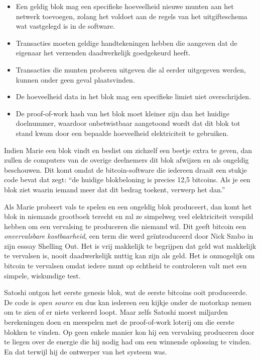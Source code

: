 \begin{itemize}
    \item Een geldig blok mag een specifieke hoeveelheid nieuwe munten aan het netwerk toevoegen, zolang het voldoet aan de regels van het uitgifteschema wat vastgelegd is in de software.
    \item Transacties moeten geldige handtekeningen hebben die aangeven dat de eigenaar het verzenden daadwerkelijk goedgekeurd heeft.
    \item Transacties die munten proberen uitgeven die al eerder uitgegeven werden, kunnen onder geen geval plaatsvinden.
    \item De hoeveelheid data in het blok mag een specifieke limiet niet overschrijden.
    \item De proof-of-work hash van het blok moet kleiner zijn dan het huidige doelnummer, waardoor onbetwistbaar aangetoond wordt dat dit blok tot stand kwam door een bepaalde hoeveelheid elektriciteit te gebruiken.
\end{itemize}

Indien Marie een blok vindt en beslist om zichzelf een beetje extra te geven, dan zullen de computers van de overige deelnemers dit blok afwijzen en als ongeldig beschouwen. Dit komt omdat de bitcoin-software die iedereen draait een stukje code bevat dat zegt: “de huidige blokbeloning is precies 12,5 bitcoins. Als je een blok ziet waarin iemand meer dat dit bedrag toekent, verwerp het dan.”

Als Marie probeert vals te spelen en een ongeldig blok produceert, dan komt het blok in niemands grootboek terecht en zal ze simpelweg veel elektriciteit verspild hebben om een vervalsing te produceren die niemand wil. Dit geeft bitcoin een \textit{onvervalsbare kostbaarheid}, een term die werd geïntroduceerd door Nick Szabo in zijn esssay \textquotedbl{}Shelling Out\textquotedbl{}. Het is vrij makkelijk te begrijpen dat geld wat makkelijk te vervalsen is, nooit daadwerkelijk nuttig kan zijn als geld. Het is onmogelijk om bitcoin te vervalsen omdat iedere munt op echtheid te controleren valt met een simpele, wiskundige test.

Satoshi ontgon het eerste \textquotedbl{}genesis\textquotedbl{} blok, wat de eerste bitcoins ooit produceerde. De code is \textit{open source} en dus kan iedereen een kijkje onder de motorkap nemen om te zien of er niets verkeerd loopt. Maar zelfs Satoshi moest miljarden berekeningen doen en meespelen met de proof-of-work loterij om die eerste blokken te vinden. Op geen enkele manier kon hij een vervalsing produceren door te liegen over de energie die hij nodig had om een winnende oplossing te vinden. En dat terwijl hij de ontwerper van het systeem was.

